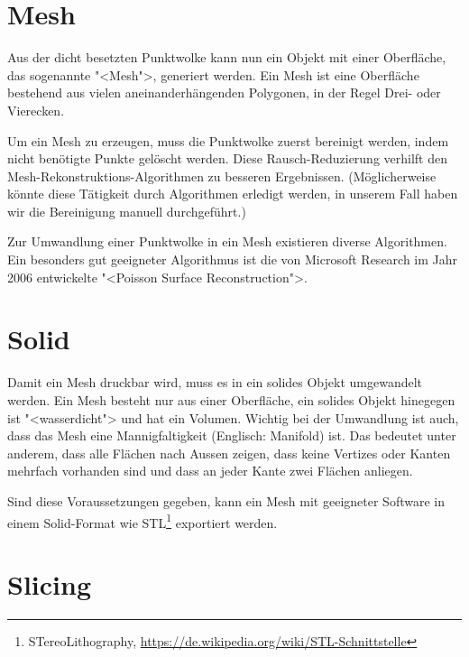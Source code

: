 \section{Mesh}

Aus der dicht besetzten Punktwolke kann nun ein Objekt mit einer Oberfläche, das
sogenannte "<Mesh">, generiert werden. Ein Mesh ist eine Oberfläche bestehend
aus vielen aneinanderhängenden Polygonen, in der Regel Drei- oder Vierecken.

Um ein Mesh zu erzeugen, muss die Punktwolke zuerst bereinigt werden, indem
nicht benötigte Punkte gelöscht werden. Diese Rausch-Reduzierung verhilft den
Mesh-Rekonstruktions-Algorithmen zu besseren Ergebnissen. (Möglicherweise könnte
diese Tätigkeit durch Algorithmen erledigt werden, in unserem Fall haben wir die
Bereinigung manuell durchgeführt.)

Zur Umwandlung einer Punktwolke in ein Mesh existieren diverse Algorithmen. Ein
besonders gut geeigneter Algorithmus ist die von Microsoft Research im Jahr
2006 entwickelte "<Poisson Surface Reconstruction">\cite{kazhdan:2006}.


\section{Solid}

Damit ein Mesh druckbar wird, muss es in ein solides Objekt umgewandelt werden.
Ein Mesh besteht nur aus einer Oberfläche, ein solides Objekt hinegegen ist
"<wasserdicht"> und hat ein Volumen. Wichtig bei der Umwandlung ist auch, dass
das Mesh eine Mannigfaltigkeit (Englisch: Manifold) ist. Das bedeutet unter
anderem, dass alle Flächen nach Aussen zeigen, dass keine Vertizes oder Kanten
mehrfach vorhanden sind und dass an jeder Kante zwei Flächen anliegen.

Sind diese Voraussetzungen gegeben, kann ein Mesh mit geeigneter Software in
einem Solid-Format wie STL\footnote{STereoLithography,
	\url{https://de.wikipedia.org/wiki/STL-Schnittstelle}} exportiert werden.


\section{Slicing}


